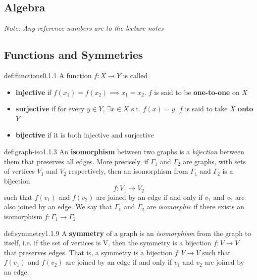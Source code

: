\documentclass[landscape, 8pt]{extarticle}
\begin{document}
\setlength{\abovedisplayskip}{3.5pt}
\setlength{\belowdisplayskip}{3.5pt}
\setlength{\abovedisplayshortskip}{3.5pt}
\setlength{\belowdisplayshortskip}{3.5pt}

\begin{multicols}{3}
\raggedcolumns
\section{\huge Algebra}
\textit{Note: Any reference numbers are to the lecture notes}
\vspace{-5pt}
\subsection*{Functions and Symmetries}




\begin{dfn}[Functions]{def:functions}{0.1.1}
A function $f:X\to Y$ is called
\renewcommand\labelitemi{\tiny$\bullet$}
\begin{itemize}
    \setlength\itemsep{0em}
    \item \textbf{injective} if $f(x_{1}) = f(x_{2}) \implies x_{1} = x_{{2}}$. $f$ is said to be \textbf{one-to-one} on $X$
    \item \textbf{surjective} if for every $y\in Y,\, \exists x\in X$ s.t. $f(x) = y$. $f$ is said to take $X$ \textbf{onto} $Y$
    \item \textbf{bijective} if it is both injective and surjective
\end{itemize}
\end{dfn}
\vspace{-5pt}

\begin{dfn}{def:graph-iso}{1.1.3}
    An \textbf{isomorphism} between two graphs is a \textit{bijection} between them that preserves all edges. More precisely, if $\Gamma_{1}$ and $\Gamma_{2}$ are graphs, with sets of vertices $V_{1}$ and $V_{2}$ respectively, then an isomorphism from $\Gamma_{1}$ and $\Gamma_{2}$ is a bijection
    \[f : V_{1}\to V_{2}\]
    such that $f(v_{1})$ and $f(v_{2})$ are joined by an edge if and only if $v_{1}$ and $v_{2}$ are also joined by an edge.
    We say that $\Gamma_{1}$ and $\Gamma_{2}$ are \textit{isomorphic} if there exists an isomorphism $f:\Gamma_{1}\to\Gamma_{2}$
\end{dfn}
\vspace{-5pt}

\begin{dfn}[Symmetry]{def:symmetry}{1.1.9}
    A \textbf{symmetry} of a graph is an \textit{isomorphism} from the graph to itself, i.e. if the set of vertices is V, then the symmetry is a bijection $f:V\to V$ that preserves edges. That is, a symmetry is a bijection $f:V\to V$ such that $f(v_{1})$ and $f(v_{2})$ are joined by an edge if and only if $v_{1}$ and $v_{2}$ are joined by an edge.
\end{dfn}
\vspace{-5pt}


\end{multicols}
\end{document}
